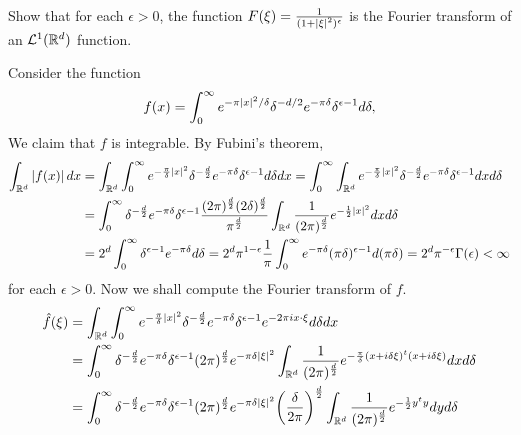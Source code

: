 \begin{exercise}
    Show that for each $\epsilon>0$, the function $F(\xi) = \frac{1}{(1+\left\lvert {\xi} \right\rvert^2)^\epsilon}$ is 
    the Fourier transform of an $\mathcal{L}^1(\mathbb{R}^d)$ function.
\end{exercise}
\begin{pf}
    Consider the function 
    \begin{equation*}
        f(x) = \int_0^{\infty} e^{-\pi\left\lvert {x} \right\rvert^2/\delta}\delta^{-d/2}e^{-\pi\delta}\delta^{\epsilon-1}d\delta,
    \end{equation*}
    We claim that $f$ is integrable. By Fubini's theorem, 
    \begin{equation*}
        \begin{split}
            \int_{\mathbb{R}^d} \left\lvert {f(x)} \right\rvert dx &= \int_{\mathbb{R}^d} \int_0^{\infty} e^{-\frac{\pi}{\delta}\left\lvert {x} \right\rvert^2}\delta^{-\frac{d}{2}}e^{-\pi\delta}\delta^{\epsilon-1}d\delta dx 
            = \int_0^\infty \int_{\mathbb{R}^d} e^{-\frac{\pi}{\delta}\left\lvert {x} \right\rvert^2}\delta^{-\frac{d}{2}}e^{-\pi\delta}\delta^{\epsilon-1}dx d\delta \\ 
            &= \int_0^\infty \delta^{-\frac{d}{2}}e^{-\pi\delta}\delta^{\epsilon-1}\frac{(2\pi)^{\frac{d}{2}}(2\delta)^{\frac{d}{2}}}{\pi^{\frac{d}{2}}}\int_{\mathbb{R}^d}\frac{1}{(2\pi)^{\frac{d}{2}}} e^{-\frac{1}{2}\left\lvert {x} \right\rvert^2} dxd\delta \\
            &= 2^d\int_0^\infty \delta^{\epsilon-1}e^{-\pi\delta}d\delta 
            = 2^d\pi^{1-\epsilon}\frac{1}{\pi}\int_0^\infty e^{-\pi\delta}(\pi\delta)^{\epsilon-1}d(\pi\delta) = 2^d\pi^{-\epsilon}\Gamma(\epsilon) < \infty
        \end{split}
    \end{equation*}
    for each $\epsilon>0$. Now we shall compute the Fourier transform of $f$. 
    \begin{equation*}
        \begin{split}
            \hat{f}(\xi) &= \int_{\R^d}\int_0^\infty e^{-\frac{\pi}{\delta}\abs{x}^2}\delta^{-\frac{d}{2}}e^{-\pi\delta}\delta^{\epsilon-1}e^{-2\pi i x\cdot\xi}d\delta dx \\ 
            &= \int_0^\infty \delta^{-\frac{d}{2}}e^{-\pi\delta}\delta^{\epsilon-1}(2\pi)^{\frac{d}{2}}e^{-\pi\delta\abs{\xi}^2} \int_{\R^d} \frac{1}{(2\pi)^{\frac{d}{2}}} e^{-\frac{\pi}{\delta}(x+i\delta\xi)^t(x+i\delta\xi)}dx d\delta \\ 
            &= \int_0^\infty \delta^{-\frac{d}{2}}e^{-\pi\delta}\delta^{\epsilon-1}(2\pi)^{\frac{d}{2}}e^{-\pi\delta\abs{\xi}^2}\pth{\frac{\delta}{2\pi}}^{\frac{d}{2}} \int_{\R^d} \frac{1}{(2\pi)^{\frac{d}{2}}} e^{-\frac{1}{2}y^ty}dy d\delta \\ 

\end{split}
\end{equation*}
\end{pf}
